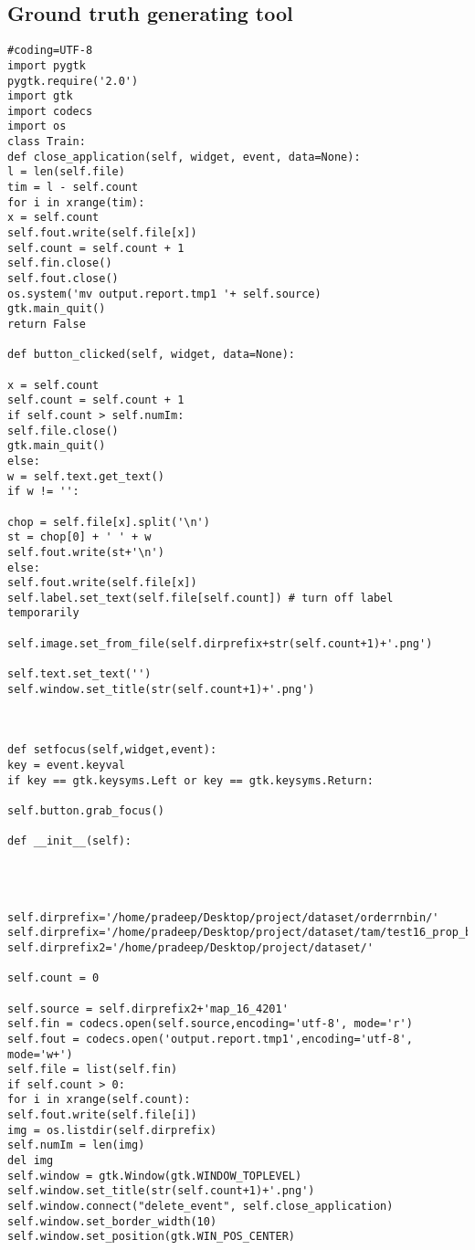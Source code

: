 \subsection{Ground truth generating tool}
\begin{verbatim}
#coding=UTF-8
import pygtk
pygtk.require('2.0')
import gtk
import codecs
import os
class Train:
def close_application(self, widget, event, data=None):
l = len(self.file)
tim = l - self.count
for i in xrange(tim):
x = self.count
self.fout.write(self.file[x])
self.count = self.count + 1
self.fin.close()
self.fout.close()
os.system('mv output.report.tmp1 '+ self.source)
gtk.main_quit()
return False

def button_clicked(self, widget, data=None):

x = self.count
self.count = self.count + 1
if self.count > self.numIm:
self.file.close()
gtk.main_quit()
else:
w = self.text.get_text()
if w != '':

chop = self.file[x].split('\n')
st = chop[0] + ' ' + w
self.fout.write(st+'\n')
else:
self.fout.write(self.file[x])
self.label.set_text(self.file[self.count]) # turn off label temporarily

self.image.set_from_file(self.dirprefix+str(self.count+1)+'.png')

self.text.set_text('')
self.window.set_title(str(self.count+1)+'.png')



def setfocus(self,widget,event):
key = event.keyval
if key == gtk.keysyms.Left or key == gtk.keysyms.Return:

self.button.grab_focus()

def __init__(self):




self.dirprefix='/home/pradeep/Desktop/project/dataset/orderrnbin/'
self.dirprefix='/home/pradeep/Desktop/project/dataset/tam/test16_prop_bin/'
self.dirprefix2='/home/pradeep/Desktop/project/dataset/'

self.count = 0

self.source = self.dirprefix2+'map_16_4201'
self.fin = codecs.open(self.source,encoding='utf-8', mode='r')
self.fout = codecs.open('output.report.tmp1',encoding='utf-8', mode='w+')
self.file = list(self.fin)
if self.count > 0:
for i in xrange(self.count):
self.fout.write(self.file[i])
img = os.listdir(self.dirprefix)
self.numIm = len(img)
del img
self.window = gtk.Window(gtk.WINDOW_TOPLEVEL)
self.window.set_title(str(self.count+1)+'.png')
self.window.connect("delete_event", self.close_application)
self.window.set_border_width(10)
self.window.set_position(gtk.WIN_POS_CENTER)


\end{verbatim}
